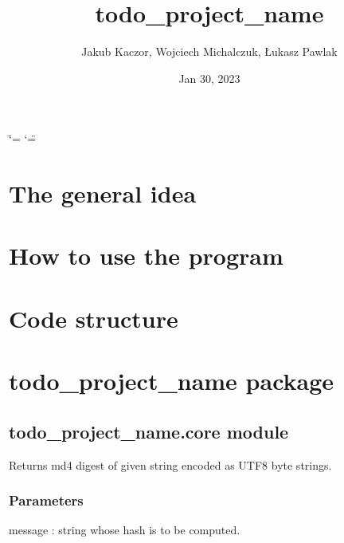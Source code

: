 \documentclass[letterpaper,10pt,english]{sphinxmanual}
\title{todo\_project\_name}
\date{Jan 30, 2023}
\author{Jakub Kaczor, Wojciech Michalczuk, Łukasz Pawlak}
\begin{document}
\ifdefined\shorthandoff
  \ifnum\catcode`\=\string=\active\shorthandoff{=}\fi
  \ifnum\catcode`\"=\active{}\fi
\fi

\pagestyle{empty}
\sphinxmaketitle
\pagestyle{plain}
\sphinxtableofcontents
\pagestyle{normal}
\label{\detokenize{index::doc}}


\sphinxstepscope


\chapter{The general idea}
\chapter{How to use the program}
\chapter{Code structure}



\chapter{todo\_project\_name package}
\label{\detokenize{modules:todo-project-name}}\label{\detokenize{modules::doc}}
\sphinxstepscope


\section{todo\_project\_name.core module}
\label{\detokenize{todo_project_name:module-todo_project_name.core}}\label{\detokenize{todo_project_name:todo-project-name-core-module}}

\begin{fulllineitems}
\label{\detokenize{todo_project_name:todo_project_name.core.md4_string}}
\pysigstartsignatures
{}
\pysigstopsignatures
\sphinxAtStartPar
Returns md4 digest of given string encoded as UTF\sphinxhyphen{}8 byte strings.


\subsection{Parameters}
\label{\detokenize{todo_project_name:parameters}}
\sphinxAtStartPar
message
: string whose hash is to be computed.

\end{fulllineitems}
\end{document}
